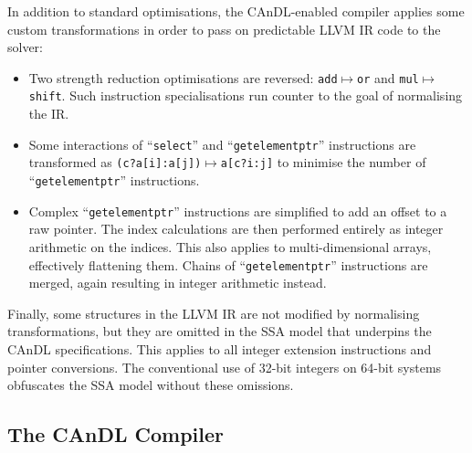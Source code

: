     In addition to standard optimisations, the CAnDL-enabled compiler applies
    some custom transformations in order to pass on predictable LLVM IR code
    to the solver:
    \begin{itemize}
        \item Two strength reduction optimisations are reversed:
              {\tt add}$\mapsto${\tt or} and {\tt mul}$\mapsto${\tt shift}.
              Such instruction specialisations run counter to the goal of
              normalising the IR.
        \item Some interactions of ``{\tt select}'' and
              ``{\tt getelementptr}'' instructions are transformed as
              {\tt (c?a[i]:a[j])}$\mapsto${\tt a[c?i:j]} to minimise the number
              of ``{\tt getelementptr}'' instructions.
        \item Complex ``{\tt getelementptr}'' instructions are simplified to
              add an offset to a raw pointer.
              The index calculations are then performed entirely as integer
              arithmetic on the indices.
              This also applies to multi-dimensional arrays, effectively
              flattening them.
              Chains of ``{\tt getelementptr}'' instructions are merged, again
              resulting in integer arithmetic instead.
    \end{itemize}
    Finally, some structures in the LLVM IR are not modified by normalising
    transformations, but they are omitted in the SSA model that underpins the
    CAnDL specifications.
    This applies to all integer extension instructions and pointer conversions.
    The conventional use of 32-bit integers on 64-bit systems obfuscates the
    SSA model without these omissions.

\subsection{The CAnDL Compiler}

